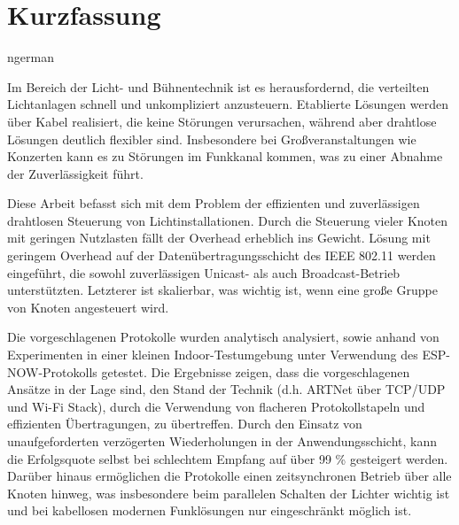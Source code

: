 \documentclass[]{ccs-thesis}
\begin{document}
\chapter*{Kurzfassung}
\begin{otherlanguage*}{ngerman}

Im Bereich der Licht- und Bühnentechnik ist es herausfordernd, 
die verteilten Lichtanlagen schnell und unkompliziert anzusteuern.
Etablierte Lösungen werden über Kabel realisiert, die keine Störungen verursachen,
während aber drahtlose Lösungen deutlich flexibler sind.
Insbesondere bei Großveranstaltungen wie Konzerten kann es zu Störungen im Funkkanal kommen,
was zu einer Abnahme der Zuverlässigkeit führt.

Diese Arbeit befasst sich mit dem Problem der effizienten und zuverlässigen drahtlosen Steuerung von Lichtinstallationen.
Durch die Steuerung vieler Knoten mit geringen Nutzlasten fällt der Overhead erheblich ins Gewicht.
Lösung mit geringem Overhead auf der Datenübertragungsschicht des IEEE 802.11 werden eingeführt,
die sowohl zuverlässigen Unicast- als auch Broadcast-Betrieb unterstützten.
Letzterer ist skalierbar, was wichtig ist, wenn eine große Gruppe von Knoten angesteuert wird.

Die vorgeschlagenen Protokolle wurden analytisch analysiert,
sowie anhand von Experimenten in einer kleinen Indoor-Testumgebung unter Verwendung des ESP-NOW-Protokolls getestet.
Die Ergebnisse zeigen, dass die vorgeschlagenen Ansätze in der Lage sind, 
den Stand der Technik (d.h. ARTNet über TCP/UDP und Wi-Fi Stack),
durch die Verwendung von flacheren Protokollstapeln und effizienten Übertragungen, zu übertreffen.
Durch den Einsatz von unaufgeforderten verzögerten Wiederholungen in der Anwendungsschicht,
kann die Erfolgsquote selbst bei schlechtem Empfang auf über 99 \% gesteigert werden.
Darüber hinaus ermöglichen die Protokolle einen zeitsynchronen Betrieb über alle Knoten hinweg,
was insbesondere beim parallelen Schalten der Lichter wichtig ist 
und bei kabellosen modernen Funklösungen nur eingeschränkt möglich ist. 

\end{otherlanguage*}
\acresetall

\cleardoublepage
\tableofcontents

\cleardoublepage
{}












% 

\cleardoublepage

\listofabbreviations
\clearpage

\listoffigures
\clearpage

\listoftables
\clearpage

\lstlistoflistings
\clearpage

\printbibliography
\end{document}
